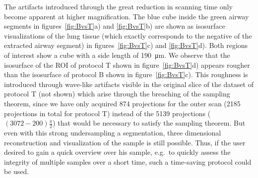The artifacts introduced through the great reduction in scanning time only become apparent at higher magnification. The blue cube inside the green airway segments in figures~\ref{fig:BvsT}a) and \ref{fig:BvsT}b) are shown as isosurface visualizations of the lung tissue (which exactly corresponds to the negative of the extracted airway segment) in figures~\ref{fig:BvsT}c) and \ref{fig:BvsT}d). Both regions of interest show a cube with a side length of \SI{190}{\micro\meter}. We observe that the isosurface of the ROI of protocol T shown in figure~\ref{fig:BvsT}d) appears rougher than the isosurface of protocol B shown in figure~\ref{fig:BvsT}c). This roughness is introduced through wave-like artifacts visible in the original slice of the dataset of protocol T (not shown) which arise through the breaching of the sampling theorem, since we have only acquired 874 projections for the outer scan (2185 projections in total for protocol T) instead of the 5139 projections ($(3072-200)\frac{\pi}{2}$) that would be necessary to satisfy the sampling theorem. But even with this strong undersampling a segmentation, three dimensional reconstruction and visualization of the sample is still possible. Thus, if the user desired to gain a quick overview over his sample, e.g.\ to quickly assess the integrity of multiple samples over a short time, such a time-saving protocol could be used.

